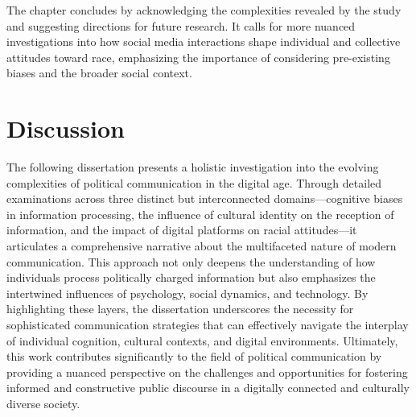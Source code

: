 \documentclass[12pt]{article}[1in]
\begin{document}
The chapter concludes by acknowledging the complexities revealed by the study and suggesting directions for future research. It calls for more nuanced investigations into how social media interactions shape individual and collective attitudes toward race, emphasizing the importance of considering pre-existing biases and the broader social context.

\section*{Discussion}

The following dissertation presents a holistic investigation into the evolving complexities of political communication in the digital age. Through detailed examinations across three distinct but interconnected domains—cognitive biases in information processing, the influence of cultural identity on the reception of information, and the impact of digital platforms on racial attitudes—it articulates a comprehensive narrative about the multifaceted nature of modern communication. This approach not only deepens the understanding of how individuals process politically charged information but also emphasizes the intertwined influences of psychology, social dynamics, and technology. By highlighting these layers, the dissertation underscores the necessity for sophisticated communication strategies that can effectively navigate the interplay of individual cognition, cultural contexts, and digital environments. Ultimately, this work contributes significantly to the field of political communication by providing a nuanced perspective on the challenges and opportunities for fostering informed and constructive public discourse in a digitally connected and culturally diverse society.

\vspace{1em}
\end{document}

